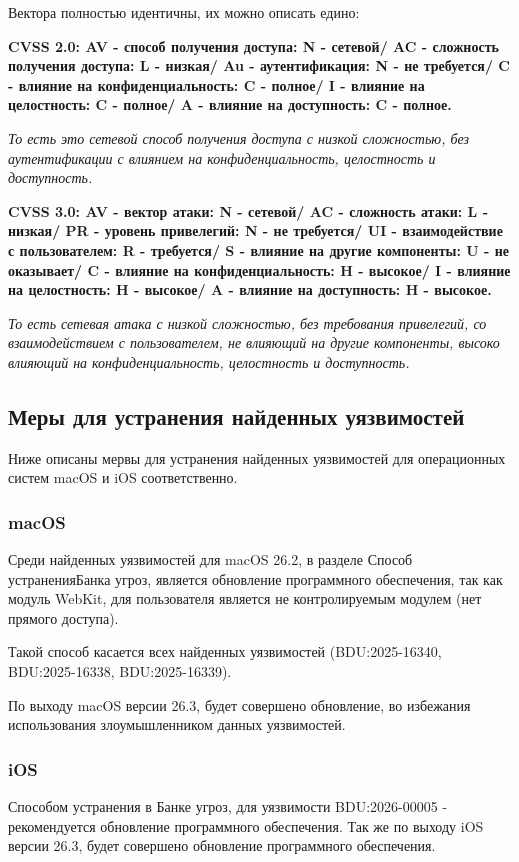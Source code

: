 \documentclass[areasetadvanced]{scrartcl}
\begin{document}
Вектора полностью идентичны, их можно описать едино:

\textbf{CVSS 2.0: AV - способ получения доступа: N - сетевой/ AC - сложность получения доступа: L - низкая/
Au - аутентификация: N - не требуется/ C - влияние на конфиденциальность: C - полное/ I - влияние
на целостность: C - полное/ A - влияние на доступность: C - полное.}

\emph{То есть это сетевой способ получения доступа с низкой сложностью, без аутентификации с влиянием на конфиденциальность, целостность и доступность.}

\textbf{CVSS 3.0: AV - вектор атаки: N - сетевой/ AC - сложность атаки: L - низкая/ PR - уровень привелегий: N - не требуется/ UI - взаимодействие с пользователем: R - требуется/ S - влияние на другие компоненты:
U - не оказывает/ C - влияние на конфиденциальность: H - высокое/ I - влияние
на целостность: H - высокое/ A - влияние на доступность: H - высокое.}

\emph{То есть сетевая атака с низкой сложностью, без требования привелегий, со взаимодействием с пользователем, не влияющий на другие компоненты, высоко влияющий на конфиденциальность, целостность и доступность.}

\subsection{Меры для устранения найденных уязвимостей}
Ниже описаны мервы для устранения найденных уязвимостей для операционных систем macOS и iOS соответственно.
\subsubsection{macOS}
Среди найденных уязвимостей для macOS 26.2, в разделе \guillemetleft  Способ устранения\guillemetright Банка угроз\cite{bdu}, является обновление программного обеспечения,
так как модуль WebKit, для пользователя является не контролируемым модулем (нет прямого доступа).

Такой способ касается всех найденных уязвимостей (BDU:2025-16340, BDU:2025-16338, BDU:2025-16339).

По выходу macOS версии 26.3, будет совершено обновление, во избежания использования злоумышленником данных уязвимостей.

\subsubsection{iOS}
Способом устранения в Банке угроз\cite{bdu}, для уязвимости BDU:2026-00005 - рекомендуется обновление программного обеспечения. 
Так же по выходу iOS версии 26.3, будет совершено обновление программного обеспечения.
\end{document}
